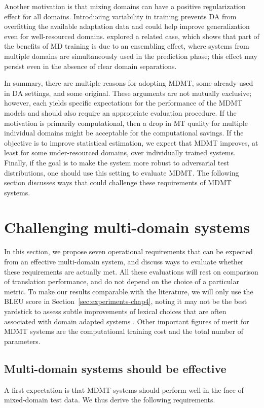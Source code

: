 Another motivation is that mixing domains can have a positive regularization effect for all domains. Introducing variability in training prevents DA from overfitting the available adaptation data and could help improve generalization even for well-resourced domains. \citet{Joshi12multidomain} explored a related case, which shows that part of the benefits of MD training is due to an ensembling effect, where systems from multiple domains are simultaneously used in the prediction phase; this effect may persist even in the absence of clear domain separations.

In summary, there are multiple reasons for adopting MDMT, some already used in DA settings, and some original. These arguments are not mutually exclusive; however, each yields specific expectations for the performance of the MDMT models and should also require an appropriate evaluation procedure. If the motivation is primarily computational, then a drop in MT quality for multiple individual domains might be acceptable for the computational savings. If the objective is to improve statistical estimation, we expect that MDMT improves, at least for some under-resourced domains, over individually trained systems. Finally, if the goal is to make the system more robust to adversarial test distributions, one should use this setting to evaluate MDMT. The following section discusses ways that could challenge these requirements of MDMT systems. 

\section{Challenging multi-domain systems \label{sec:challenging-chap4}}
In this section, we propose seven operational requirements that can be expected from an effective multi-domain system, and discuss ways to evaluate whether these requirements are actually met. All these evaluations will rest on comparison of translation performance, and do not depend on the choice of a particular metric. To make our results comparable with the literature, we will only use the BLEU score \citep{Papineni02bleu} in Section~\ref{sec:experiments-chap4}, noting it may not be the best yardstick to assess subtle improvements of lexical choices that are often associated with domain adapted systems \citep{Irvine13measuring}. Other important figures of merit for MDMT systems are the computational training cost and the total number of parameters.

\subsection{Multi-domain systems should be effective \label{ssec:effective-chap4}}
A first expectation is that MDMT systems should perform well in the face of mixed-domain test data. We thus derive the following requirements.

